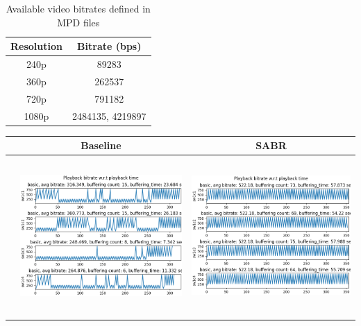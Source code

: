 \documentclass[12pt]{article}
\begin{document}
\begin{table}[ht]
    \centering
    \begin{tabular}{|c|c|}
    \hline Resolution & Bitrate (bps) \\ \hline
       240p & 89283 \\ 
       360p & 262537 \\
       720p & 791182 \\
       1080p & 2484135, 4219897 \\
       \hline 
    \end{tabular}
    \caption{Available video bitrates defined in MPD files}
    \label{tbl:mpd_bitrate}
\end{table}

\begin{table}[ht]
  \centering
  \begin{tabular}{ | m{1em} | c | c |}
    \hline
    & Baseline & SABR \\ \hline
    \parbox[t]{2mm}{}
    &
    \begin{minipage}{.45\textwidth}
      \includegraphics[width=\linewidth, height=60mm]{images/results/baseline_basic.png}
    \end{minipage}
    &
    \begin{minipage}{.45\textwidth}
      \includegraphics[width=\linewidth, height=60mm]{images/results/sabr_basic.png}

\end{minipage}
\end{tabular}
\end{table}
\end{document}
